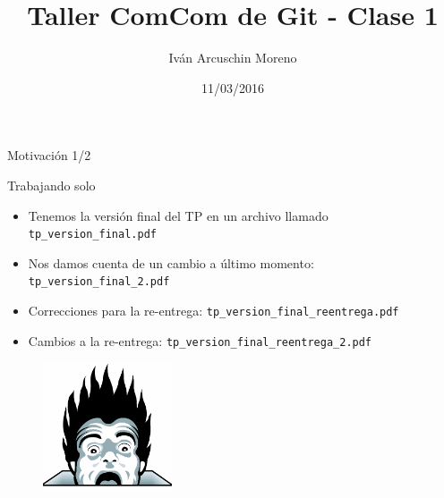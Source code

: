 \documentclass{beamer}
\title[Taller ComCom de Git - Clase 1]{Taller ComCom de Git - Clase 1}
\author[Iván Arcuschin]{Iván Arcuschin Moreno}
\institute{ComCom - DC - FCEyN - UBA}
\date{11/03/2016}
\begin{document}
\begin{frame}
  \titlepage
\end{frame}

\begin{frame}{Motivación 1/2}

    \begin{block}{Trabajando solo}
        \begin{itemize}
            \item Tenemos la versión final del TP en un archivo llamado \texttt{tp\_version\_final.pdf}
            \pause
            \item Nos damos cuenta de un cambio a último momento: \texttt{tp\_version\_final\_2.pdf}
            \pause
            \item Correcciones para la re-entrega: \texttt{tp\_version\_final\_reentrega.pdf}
            \pause
            \item Cambios a la re-entrega: \texttt{tp\_version\_final\_reentrega\_2.pdf}
        \end{itemize}
    \end{block}

    \pause
    \begin{figure}[ht]
        \begin{center}
            \includegraphics[height=1.5in]{images/horror.png}
        \end{center}
    \end{figure}

\end{frame}
\end{document}
